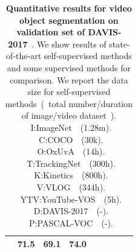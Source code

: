 \documentclass{article}
\begin{document}
\begin{table}[t]
{\begin{tabular}{ccccccccc}
			& 71.5   & 69.1 & 74.0  \\
			\bottomrule
		\end{tabular}
	}
	\captionsetup{font=footnotesize}
	\caption{\textbf{Quantitative results for video object segmentation on validation set of DAVIS-2017}~\cite{pont20172017}. We show results of state-of-the-art self-supervised methods and some supervised methods for comparison. We report the data size for self-supervised methods~(~total number/duration of image/video dataset~). ~I:ImageNet~\cite{deng2009large}~(1.28m). ~C:COCO~\cite{lin2014microsoft}~(30k). ~O:OxUvA~\cite{valmadre2018long}~(14h). ~T:TrackingNet~\cite{muller2018trackingnet}~(300h). ~K:Kinetics~\cite{carreira2017quo}~(800h). ~V:VLOG~\cite{fouhey2018lifestyle}~(344h). ~YTV:YouTube-VOS~\cite{xu2018youtube}~(5h). ~D:DAVIS-2017~\cite{pont20172017}~(-). ~P:PASCAL-VOC~\cite{everingham2015pascal}~(-).}
	\label{table:sota}
	\vspace{-17pt}
\end{table}
\end{document}
